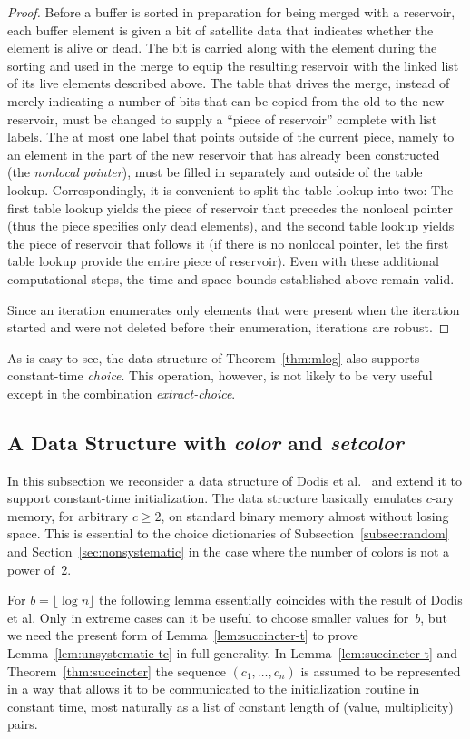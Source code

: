 \documentclass[envcountsame,envcountsect,undated,nolinenumbers]{lnthi}
\def\Tvn#1{\hbox{\textit{#1\/}}}
\def\Tfloor#1{\lfloor #1\rfloor}
\begin{document}
\begin{proof}
Before a buffer is sorted in preparation for being
merged with a reservoir, each buffer element is
given a bit of satellite data that indicates
whether the element is alive or dead.
The bit is carried along with the element during
the sorting and used in the merge to equip the
resulting reservoir with the linked list of its
live elements described above.
The table that drives the merge,
instead of merely indicating a number of bits
that can be copied from the old to the new
reservoir, must be changed to supply a
``piece of reservoir'' complete with list labels.
The at most one label that points outside of
the current piece, namely to an element in
the part of the new reservoir that has already
been constructed
(the \emph{nonlocal pointer}),
must be filled in separately
and outside of the table lookup.
Correspondingly, it is convenient to split
the table lookup into two:
The first table lookup yields the piece of
reservoir that precedes the nonlocal pointer
(thus the piece specifies
only dead elements), and the second table lookup
yields the piece of reservoir that follows it
(if there is no nonlocal pointer, let the
first table lookup
provide the entire piece of reservoir).
Even with these additional computational
steps, the time and
space bounds established above remain valid.

Since an iteration enumerates only elements that
were present when the iteration started and were
not deleted before their enumeration, iterations
are
robust.
\end{proof}

As is easy to see, the data structure of
Theorem~\ref{thm:mlog} also supports constant-time \Tvn{choice}.
This operation,
however, is not likely to
be very useful except in the combination \Tvn{extract-choice}.

\subsection{A Data Structure with \Tvn{color} and \Tvn{setcolor}}

In this subsection we reconsider a data structure
of Dodis et al.~\cite{DodPT10} and extend it to support
constant-time initialization.
The data structure basically emulates
$c$-ary memory, for arbitrary $c\ge 2$,
on standard binary memory almost without
losing space.
This is essential
to the choice dictionaries
of Subsection~\ref{subsec:random}
and Section~\ref{sec:nonsystematic} in the case
where the number of colors is not a power of~2.

For $b=\Tfloor{\log n}$ the following lemma
essentially coincides with the result
of Dodis et al.
Only in extreme cases can it be useful
to choose smaller values for~$b$, but we need the
present form of Lemma~\ref{lem:succincter-t}
to prove Lemma~\ref{lem:unsystematic-tc}
in full generality.
In Lemma~\ref{lem:succincter-t} and Theorem~\ref{thm:succincter}
the sequence $(c_1,\ldots,c_n)$ is assumed to be represented
in a way that allows it to be communicated to the
initialization routine in constant time,
most naturally as a list of constant length
of (value, multiplicity) pairs.
\end{document}
